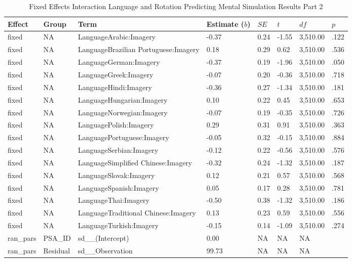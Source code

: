 \documentclass[
  man,mask,floatsintext]{apa7}
\begin{document}
\begin{table}[tbp]

\begin{center}
\begin{threeparttable}

\caption{\label{tab:pred_interact_2}Fixed Effects Interaction Language and Rotation Predicting Mental Simulation Results Part 2}

\footnotesize{

\begin{tabular}{llllllll}
\toprule
Effect & Group & Term & Estimate ($b$) & $SE$ & $t$ & $df$ & $p$\\
\midrule
fixed & NA & LanguageArabic:Imagery & -0.37 & 0.24 & -1.55 & 3,510.00 & .122\\
fixed & NA & LanguageBrazilian Portuguese:Imagery & 0.18 & 0.29 & 0.62 & 3,510.00 & .536\\
fixed & NA & LanguageGerman:Imagery & -0.37 & 0.19 & -1.96 & 3,510.00 & .050\\
fixed & NA & LanguageGreek:Imagery & -0.07 & 0.20 & -0.36 & 3,510.00 & .718\\
fixed & NA & LanguageHindi:Imagery & -0.36 & 0.27 & -1.34 & 3,510.00 & .181\\
fixed & NA & LanguageHungarian:Imagery & 0.10 & 0.22 & 0.45 & 3,510.00 & .653\\
fixed & NA & LanguageNorwegian:Imagery & -0.07 & 0.19 & -0.35 & 3,510.00 & .726\\
fixed & NA & LanguagePolish:Imagery & 0.29 & 0.31 & 0.91 & 3,510.00 & .363\\
fixed & NA & LanguagePortuguese:Imagery & -0.05 & 0.32 & -0.15 & 3,510.00 & .884\\
fixed & NA & LanguageSerbian:Imagery & -0.12 & 0.22 & -0.56 & 3,510.00 & .576\\
fixed & NA & LanguageSimplified Chinese:Imagery & -0.32 & 0.24 & -1.32 & 3,510.00 & .187\\
fixed & NA & LanguageSlovak:Imagery & 0.12 & 0.21 & 0.57 & 3,510.00 & .568\\
fixed & NA & LanguageSpanish:Imagery & 0.05 & 0.17 & 0.28 & 3,510.00 & .781\\
fixed & NA & LanguageThai:Imagery & -0.50 & 0.38 & -1.32 & 3,510.00 & .186\\
fixed & NA & LanguageTraditional Chinese:Imagery & 0.13 & 0.23 & 0.59 & 3,510.00 & .556\\
fixed & NA & LanguageTurkish:Imagery & -0.15 & 0.14 & -1.09 & 3,510.00 & .274\\
ran\_pars & PSA\_ID & sd\_\_(Intercept) & 0.00 & NA & NA & NA & \\
ran\_pars & Residual & sd\_\_Observation & 99.73 & NA & NA & NA & \\
\bottomrule
\end{tabular}

}

\end{threeparttable}
\end{center}

\end{table}
\end{document}
